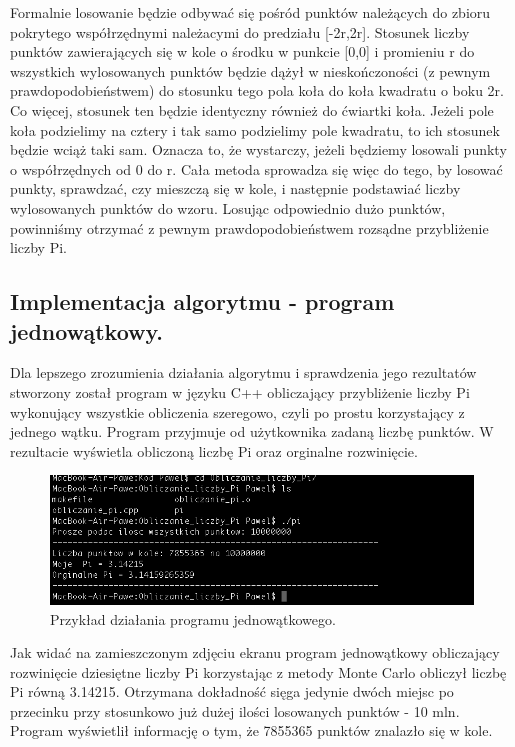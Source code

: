 \documentclass[a4paper,12pt]{article}		%
\begin{document}
 Formalnie losowanie będzie odbywać się pośród punktów należących do zbioru pokrytego współrzędnymi należacymi do predziału [-2r,2r]. Stosunek liczby punktów
zawierających się w kole o środku w punkcie [0,0] i promieniu r do wszystkich wylosowanych punktów będzie dążył w nieskończoności (z pewnym prawdopodobieństwem) do stosunku tego pola koła do koła kwadratu o boku 2r. Co więcej, stosunek ten będzie identyczny również do ćwiartki koła. Jeżeli pole koła podzielimy na cztery i tak samo podzielimy pole kwadratu, to ich stosunek będzie wciąż taki sam. Oznacza to, że wystarczy, jeżeli będziemy losowali punkty o współrzędnych od 0 do r. Cała metoda sprowadza się więc do tego, by losować punkty, sprawdzać, czy mieszczą się w kole, i następnie podstawiać liczby wylosowanych punktów do wzoru. Losując odpowiednio dużo punktów, powinniśmy otrzymać z pewnym prawdopodobieństwem rozsądne przybliżenie liczby Pi.

\subsection{Implementacja algorytmu - program jednowątkowy.} 
Dla lepszego zrozumienia działania algorytmu i sprawdzenia jego rezultatów stworzony został program w języku C++ obliczający przybliżenie liczby Pi wykonujący wszystkie obliczenia szeregowo, czyli po prostu korzystający z jednego wątku. Program przyjmuje od użytkownika zadaną liczbę punktów. W rezultacie wyświetla obliczoną liczbę Pi oraz orginalne rozwinięcie.



\begin{figure}[h!]
\centering
\includegraphics[scale=0.6]{Resources/Screen_Program_JedenWatek}
\caption{Przykład działania programu jednowątkowego.} 
\end{figure}

Jak widać na zamieszczonym zdjęciu ekranu program jednowątkowy obliczający rozwinięcie dziesiętne liczby Pi korzystając z metody Monte Carlo obliczył liczbę Pi równą 3.14215. Otrzymana dokładność sięga jedynie dwóch miejsc po przecinku przy stosunkowo już dużej ilości losowanych punktów - 10 mln. Program wyświetlił informację o tym, że 7855365 punktów znalazło się w kole.
\end{document}
